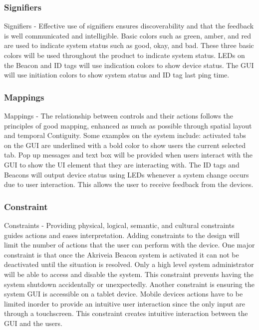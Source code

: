 \medskip
\subsubsection{Signifiers}
Signifiers - Effective use of signifiers ensures discoverability and that the feedback is well communicated and intelligible. Basic colors such as green, amber, and red are used to indicate system status such as good, okay, and bad. These three basic colors will be used throughout the product to indicate system status. LEDs on the Beacon and ID tags will use indication colors to show device status. The GUI will use initiation colors to show system status and ID tag last ping time.

\medskip
\subsubsection{Mappings}
Mappings - The relationship between controls and their actions follows the principles of good mapping, enhanced as much as possible through spatial layout and temporal Contiguity. Some examples on the system include: activated tabs on the GUI are underlined with a bold color to show users the current selected tab. Pop up messages and text box will be provided when users interact with the GUI to show the UI element that they are interacting with. The ID tags and Beacons will output device status using LEDs whenever a system change occurs due to user interaction. This allows the user to receive feedback from the devices.

\medskip
\subsubsection{Constraint}
Constraints - Providing physical, logical, semantic, and cultural constraints guides actions and eases interpretation. Adding constraints to the design will limit the number of actions that the user can perform with the device. One major constraint is that once the Akriveia Beacon system is activated it can not be deactivated until the situation is resolved. Only a high level system administrator will be able to access and disable the system. This constraint prevents having the system shutdown accidentally or unexpectedly. Another constraint is ensuring the system GUI is accessible on a tablet device. Mobile devices actions have to be limited inorder to provide an intuitive user interaction since the only input are through a touchscreen. This constraint creates intuitive interaction between the GUI and the users.
